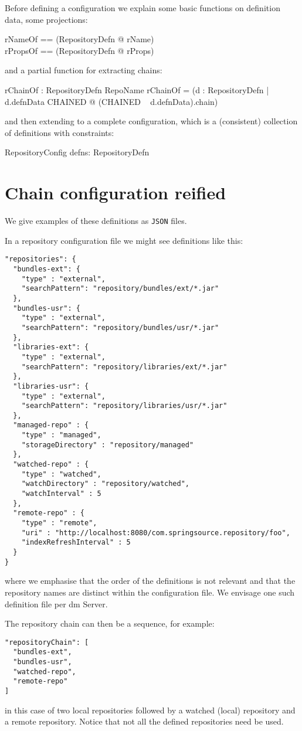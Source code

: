 \documentclass[a4paper,titlepage,twoside,12pt]{article}
\begin{document}
Before defining a configuration we explain some basic functions on definition data, some projections:
\begin{zed}
	rNameOf == (\lambda RepositoryDefn @ rName)	\\
	rPropsOf == (\lambda RepositoryDefn @ rProps)
\end{zed}
and a partial function for extracting chains:
\begin{axdef}
	rChainOf : RepositoryDefn \pfun \iseq RepoName
\where
	rChainOf = (\lambda d : RepositoryDefn | d.defnData \in \ran CHAINED @ (CHAINED \inv ~ d.defnData).chain)
\end{axdef}
and then extending to a complete configuration, which is a (consistent) collection of definitions with constraints:
\begin{schema}{RepositoryConfig}
	defns: \finset RepositoryDefn
\end{schema}

\section{Chain configuration reified}
We give examples of these definitions as \texttt{JSON} files.

In a repository configuration file we might see definitions like this:
\begin{verbatim}
"repositories": {
  "bundles-ext": { 		
    "type" : "external",
    "searchPattern": "repository/bundles/ext/*.jar"
  },
  "bundles-usr": {
    "type" : "external",
    "searchPattern": "repository/bundles/usr/*.jar"
  },
  "libraries-ext": {
    "type" : "external",
    "searchPattern": "repository/libraries/ext/*.jar"
  },
  "libraries-usr": {
    "type" : "external",
    "searchPattern": "repository/libraries/usr/*.jar"
  },
  "managed-repo" : {
    "type" : "managed",
    "storageDirectory" : "repository/managed"
  },
  "watched-repo" : {
    "type" : "watched",
    "watchDirectory" : "repository/watched",
    "watchInterval" : 5
  },
  "remote-repo" : {
    "type" : "remote",
    "uri" : "http://localhost:8080/com.springsource.repository/foo",
    "indexRefreshInterval" : 5
  }
}
\end{verbatim}
where we emphasise that the order of the definitions is not relevant and that the repository names are distinct within the configuration file.
We envisage one such definition file per dm Server.

The repository chain can then be a sequence, for example:
\begin{verbatim}
"repositoryChain": [ 
  "bundles-ext",
  "bundles-usr",
  "watched-repo",
  "remote-repo"
]
\end{verbatim}
in this case of two local repositories followed by a watched (local) repository and a remote repository. Notice that not all the defined repositories need be used.
\end{document}
